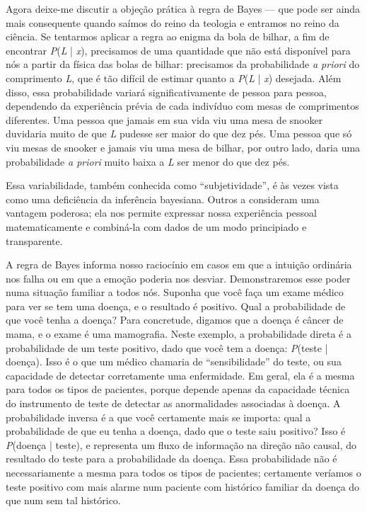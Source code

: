 \documentclass[11pt,a5paper,twoside]{book}
\begin{document}
Agora deixe-me discutir a objeção prática à regra de Bayes — que pode ser ainda mais consequente quando saímos do reino da teologia e entramos no reino da ciência. Se tentarmos aplicar a regra ao enigma da bola de bilhar, a fim de encontrar \textit{P}(\textit{L} | \textit{x}), precisamos de uma quantidade que não está disponível para nós a partir da física das bolas de bilhar: precisamos da probabilidade \textit{a priori} do comprimento \textit{L}, que é tão difícil de estimar quanto a \textit{P}(\textit{L} | \textit{x}) desejada. Além disso, essa probabilidade variará significativamente de pessoa para pessoa, dependendo da experiência prévia de cada indivíduo com mesas de comprimentos diferentes. Uma pessoa que jamais em sua vida viu uma mesa de snooker duvidaria muito de que \textit{L} pudesse ser maior do que dez pés. Uma pessoa que só viu mesas de snooker e jamais viu uma mesa de bilhar, por outro lado, daria uma probabilidade \textit{a priori} muito baixa a \textit{L} ser menor do que dez pés.

Essa variabilidade, também conhecida como “subjetividade”, é às vezes vista como uma deficiência da inferência bayesiana. Outros a consideram uma vantagem poderosa; ela nos permite expressar nossa experiência pessoal matematicamente e combiná-la com dados de um modo principiado e transparente.

A regra de Bayes informa nosso raciocínio em casos em que a intuição ordinária nos falha ou em que a emoção poderia nos desviar. Demonstraremos esse poder numa situação familiar a todos nós. Suponha que você faça um exame médico para ver se tem uma doença, e o resultado é positivo. Qual a probabilidade de que você tenha a doença? Para concretude, digamos que a doença é câncer de mama, e o exame é uma mamografia. Neste exemplo, a probabilidade direta é a probabilidade de um teste positivo, dado que você tem a doença: \textit{P}(teste | doença). Isso é o que um médico chamaria de “sensibilidade” do teste, ou sua capacidade de detectar corretamente uma enfermidade. Em geral, ela é a mesma para todos os tipos de pacientes, porque depende apenas da capacidade técnica do instrumento de teste de detectar as anormalidades associadas à doença. A probabilidade inversa é a que você certamente mais se importa: qual a probabilidade de que eu tenha a doença, dado que o teste saiu positivo? Isso é \textit{P}(doença | teste), e representa um fluxo de informação na direção não causal, do resultado do teste para a probabilidade da doença. Essa probabilidade não é necessariamente a mesma para todos os tipos de pacientes; certamente veríamos o teste positivo com mais alarme num paciente com histórico familiar da doença do que num sem tal histórico.
\end{document}
